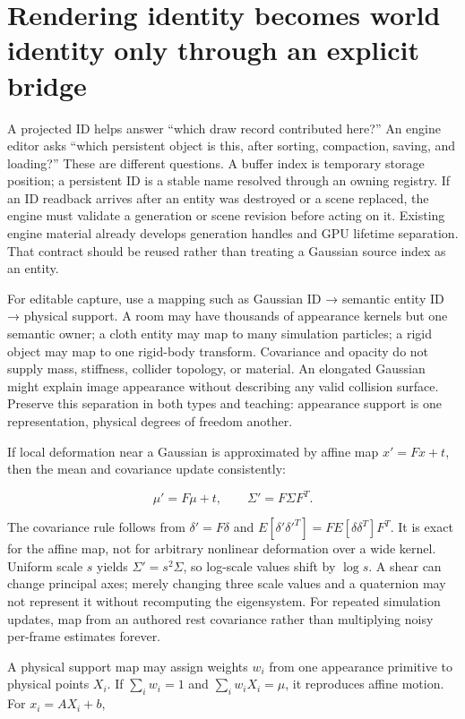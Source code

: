 \section{Rendering identity becomes world identity only through an explicit bridge}\label{06-engine-ii-ch042-rendering-identity-becomes-world-identity-only-through-an-explicit-bridge}

A projected ID helps answer ``which draw record contributed here?'' An engine editor asks ``which persistent object is this, after sorting, compaction, saving, and loading?'' These are different questions. A buffer index is temporary storage position; a persistent ID is a stable name resolved through an owning registry. If an ID readback arrives after an entity was destroyed or a scene replaced, the engine must validate a generation or scene revision before acting on it. Existing engine material already develops generation handles and GPU lifetime separation. That contract should be reused rather than treating a Gaussian source index as an entity.

For editable capture, use a mapping such as Gaussian ID → semantic entity ID → physical support. A room may have thousands of appearance kernels but one semantic owner; a cloth entity may map to many simulation particles; a rigid object may map to one rigid-body transform. Covariance and opacity do not supply mass, stiffness, collider topology, or material. An elongated Gaussian might explain image appearance without describing any valid collision surface. Preserve this separation in both types and teaching: appearance support is one representation, physical degrees of freedom another.

If local deformation near a Gaussian is approximated by affine map \(x'=Fx+t\), then the mean and covariance update consistently:

\[
\mu'=F\mu+t,\qquad \Sigma'=F\Sigma F^T.
\]

The covariance rule follows from \(\delta'=F\delta\) and \(E[\delta'\delta'^T]=FE[\delta\delta^T]F^T\). It is exact for the affine map, not for arbitrary nonlinear deformation over a wide kernel. Uniform scale \(s\) yields \(\Sigma'=s^2\Sigma\), so log-scale values shift by \(\log s\). A shear can change principal axes; merely changing three scale values and a quaternion may not represent it without recomputing the eigensystem. For repeated simulation updates, map from an authored rest covariance rather than multiplying noisy per-frame estimates forever.

A physical support map may assign weights \(w_i\) from one appearance primitive to physical points \(X_i\). If \(\sum_iw_i=1\) and \(\sum_iw_iX_i=\mu\), it reproduces affine motion. For \(x_i=AX_i+b\),

